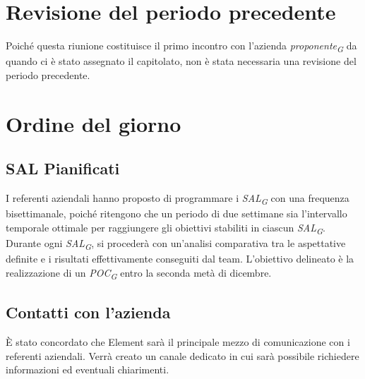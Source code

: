 \documentclass{article}
\begin{document}
\pagebreak


\maketitle
\thispagestyle{fancy}
\tableofcontents
{}
\pagebreak

\flushleft

\section{Revisione del periodo precedente}
    Poiché questa riunione costituisce il primo incontro con l'azienda \textit{proponente}\textsubscript{\textit{G}} da quando ci è stato assegnato il capitolato, non è stata necessaria una revisione del periodo precedente.  

\section{Ordine del giorno}

    \subsection{SAL Pianificati} 
        I referenti aziendali hanno proposto di programmare i \textit{SAL}\textsubscript{\textit{G}} con una frequenza bisettimanale, poiché ritengono che un periodo di due settimane sia l'intervallo temporale ottimale per raggiungere gli obiettivi stabiliti in ciascun \textit{SAL}\textsubscript{\textit{G}}. Durante ogni \textit{SAL}\textsubscript{\textit{G}}, si procederà con un'analisi comparativa tra le aspettative definite e i risultati effettivamente conseguiti dal team.
        L'obiettivo delineato è la realizzazione di un \textit{POC}\textsubscript{\textit{G}} entro la seconda metà di dicembre.  

    \subsection{Contatti con l'azienda} 
        È stato concordato che Element sarà il principale mezzo di comunicazione con i referenti aziendali. Verrà creato un canale dedicato in cui sarà possibile richiedere informazioni ed eventuali chiarimenti.  
\end{document}
